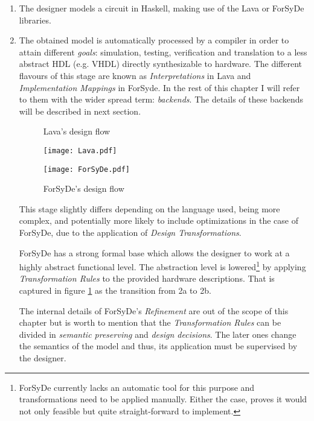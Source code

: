 \begin{enumerate}[1)]
  \item The designer models a circuit in Haskell, making use
    of the Lava or ForSyDe libraries.



  \item The obtained model is automatically processed by a compiler in
    order to attain different \textit{goals}: simulation, testing,
    verification and translation to a less abstract HDL (e.g. VHDL)
    directly synthesizable to hardware. The different flavours of this
    stage are known as \textit{Interpretations} in Lava and
    \textit{Implementation Mappings} in ForSyde. In the rest of this
    chapter I will refer to them with the wider spread term:
    \textit{backends}.  The details of these backends will be
    described in next section.


\begin{landscape}
  \begin{figure}
    \centering
    \begin{minipage}[t]{.45\linewidth}
      \caption{Lava's design flow}\label{fig:lava}
      \texttt{[image: Lava.pdf]}
    \end{minipage}
    \hfil
    \begin{minipage}[t]{.45\linewidth}
      \centering
      \caption{ForSyDe's design flow}\label{fig:forsyde}
      \texttt{[image: ForSyDe.pdf]}
    \end{minipage}
  \end{figure}
\end{landscape}


    This stage slightly differs depending on the language used, being more
    complex, and potentially more likely to include optimizations in
    the case of ForSyDe, due to the application of \textit{Design
      Transformations}.
    
    ForSyDe has a strong formal base which allows the designer to work
    at a highly abstract functional level. The abstraction level is
    lowered\footnote{ForSyDe currently lacks an automatic tool
      for this purpose and transformations need to be applied
      manually. Either the case,  \cite{forsyde:thesis} proves it would not
      only feasible but quite straight-forward to implement.} by
    applying \textit{Transformation Rules} to the provided hardware
    descriptions. That is captured in figure \ref{fig:forsyde} as the
    transition from 2a to 2b.

    The internal details of  ForSyDe's \textit{Refinement} are out of
    the scope of this chapter but is worth to mention that the
    \textit{Transformation Rules} can be divided in \textit{semantic
      preserving} and \textit{design decisions}. The later ones
    change the semantics of the model and thus, its application must be
    supervised by the designer.
\end{enumerate}
